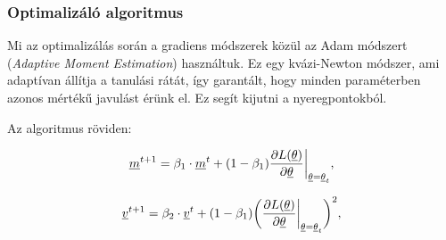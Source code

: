 %
%
%
%
%
%
%
%
%
%
%
%
%
%
%
%



\subsubsection{Optimalizáló algoritmus}
\label{sec:adam}

Mi az optimalizálás során a gradiens módszerek közül az Adam módszert (\textit{Adaptive Moment Estimation}) \cite{kingma2014adam}  használtuk. Ez egy kvázi-Newton módszer, ami adaptívan állítja a tanulási rátát, így garantált, hogy minden paraméterben azonos mértékű javulást érünk el. Ez segít kijutni a nyeregpontokból.

\noindent
Az algoritmus röviden:

\[  \underline{m}^{t+1} = \beta_1 \cdot \underline{m}^{t} + (1-\beta_1) \dfrac{\partial { L(\underline{\theta})}}{\partial {\underline{\theta}}} \bigg\rvert_{\underline{\theta}=\underline{\theta}_t} , \]

\[  \underline{v}^{t+1} = \beta_2 \cdot \underline{v}^{t} + (1-\beta_1)\bigg( \dfrac{\partial {  L(\underline{\theta})}}{\partial { \underline{\theta}}} \bigg\rvert_{\underline{\theta}=\underline{\theta}_t} \bigg)^2  ,\]

